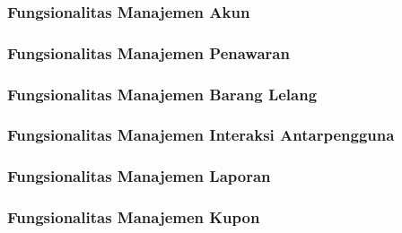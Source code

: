 
\subsubsection{Fungsionalitas Manajemen Akun}

\subsubsection{Fungsionalitas Manajemen Penawaran}

\subsubsection{Fungsionalitas Manajemen Barang Lelang}

\subsubsection{Fungsionalitas Manajemen Interaksi Antarpengguna}

\subsubsection{Fungsionalitas Manajemen Laporan}

\subsubsection{Fungsionalitas Manajemen Kupon}
